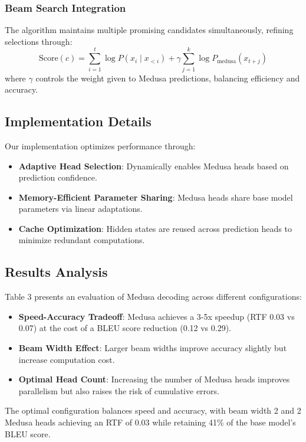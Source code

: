 \documentclass{article}
\begin{document}
\subsubsection{Beam Search Integration}
The algorithm maintains multiple promising candidates simultaneously, refining selections through:
\begin{equation}
    \text{Score}(c) = \sum_{i=1}^{t} \log P(x_i \mid x_{<i}) + \gamma \sum_{j=1}^{k} \log P_{\text{medusa}}(x_{t+j})
\end{equation}
where $\gamma$ controls the weight given to Medusa predictions, balancing efficiency and accuracy.

\subsection{Implementation Details}
Our implementation optimizes performance through:
\begin{itemize}
    \item \textbf{Adaptive Head Selection}: Dynamically enables Medusa heads based on prediction confidence.
    \item \textbf{Memory-Efficient Parameter Sharing}: Medusa heads share base model parameters via linear adaptations.
    \item \textbf{Cache Optimization}: Hidden states are reused across prediction heads to minimize redundant computations.
\end{itemize}

\subsection{Results Analysis}
Table 3 presents an evaluation of Medusa decoding across different configurations:

\begin{itemize}
    \item \textbf{Speed-Accuracy Tradeoff}: Medusa achieves a 3-5x speedup (RTF 0.03 vs 0.07) at the cost of a BLEU score reduction (0.12 vs 0.29).
    \item \textbf{Beam Width Effect}: Larger beam widths improve accuracy slightly but increase computation cost.
    \item \textbf{Optimal Head Count}: Increasing the number of Medusa heads improves parallelism but also raises the risk of cumulative errors.
\end{itemize}

The optimal configuration balances speed and accuracy, with beam width 2 and 2 Medusa heads achieving an RTF of 0.03 while retaining 41\% of the base model’s BLEU score.
\end{document}

